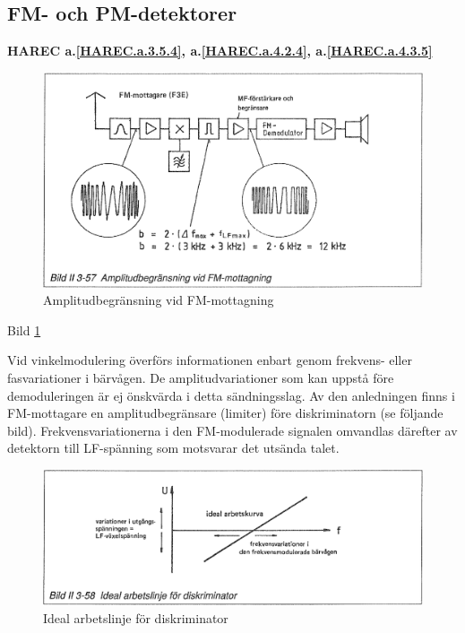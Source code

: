 \subsection{FM- och PM-detektorer}
\textbf{
HAREC a.\ref{HAREC.a.3.5.4}\label{myHAREC.a.3.5.4},
 a.\ref{HAREC.a.4.2.4}\label{myHAREC.a.4.2.4},
 a.\ref{HAREC.a.4.3.5}\label{myHAREC.a.4.3.5}
}

\begin{figure}
\includegraphics[width=\textwidth]{images/bild_2_3-57}
\caption{Amplitudbegränsning vid FM-mottagning}
\label{fig:BildII3-57}
\end{figure}

Bild \ref{fig:BildII3-57}

Vid vinkelmodulering överförs informationen enbart genom frekvens-
eller fasvariationer i bärvågen. De amplitudvariationer som kan uppstå
före demoduleringen är ej önskvärda i detta sändningsslag. Av den
anledningen finns i FM-mottagare en amplitudbegränsare (limiter) före
diskriminatorn (se följande bild). Frekvensvariationerna i den
FM-modulerade signalen omvandlas därefter av detektorn till
LF-spänning som motsvarar det utsända talet.

\begin{figure}
\includegraphics[width=\textwidth]{images/bild_2_3-58}
\caption{Ideal arbetslinje för diskriminator}
\label{fig:BildII3-58}
\end{figure}

